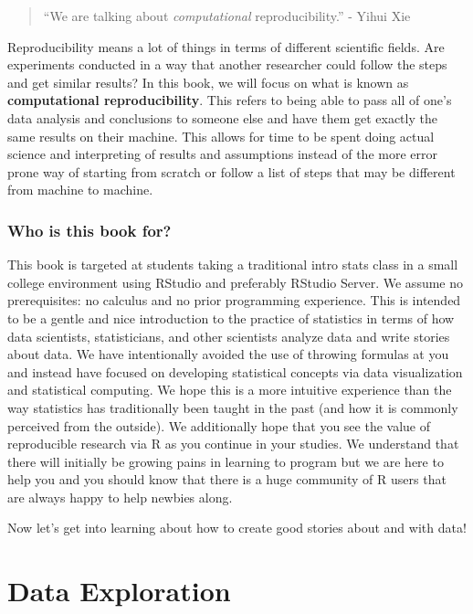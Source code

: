 \documentclass[]{tufte-book}
\begin{document}
\begin{quote}
``We are talking about \emph{computational} reproducibility.'' - Yihui
Xie
\end{quote}

Reproducibility means a lot of things in terms of different scientific
fields. Are experiments conducted in a way that another researcher could
follow the steps and get similar results? In this book, we will focus on
what is known as \textbf{computational reproducibility}. This refers to
being able to pass all of one's data analysis and conclusions to someone
else and have them get exactly the same results on their machine. This
allows for time to be spent doing actual science and interpreting of
results and assumptions instead of the more error prone way of starting
from scratch or follow a list of steps that may be different from
machine to machine.

\section{Who is this book for?}\label{who-is-this-book-for}

This book is targeted at students taking a traditional intro stats class
in a small college environment using RStudio and preferably RStudio
Server. We assume no prerequisites: no calculus and no prior programming
experience. This is intended to be a gentle and nice introduction to the
practice of statistics in terms of how data scientists, statisticians,
and other scientists analyze data and write stories about data. We have
intentionally avoided the use of throwing formulas at you and instead
have focused on developing statistical concepts via data visualization
and statistical computing. We hope this is a more intuitive experience
than the way statistics has traditionally been taught in the past (and
how it is commonly perceived from the outside). We additionally hope
that you see the value of reproducible research via R as you continue in
your studies. We understand that there will initially be growing pains
in learning to program but we are here to help you and you should know
that there is a huge community of R users that are always happy to help
newbies along.

Now let's get into learning about how to create good stories about and
with data!

\part{Data Exploration}\label{part-data-exploration}
\end{document}
